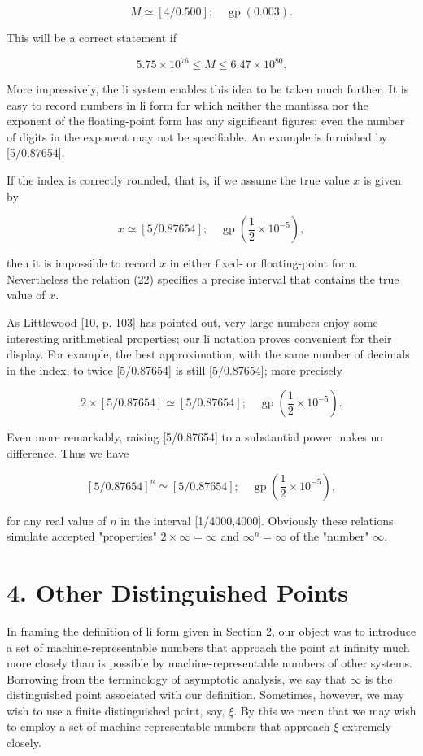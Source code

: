\documentclass[10pt]{article}
\begin{document}
$$
M \simeq[4 / 0.500] ; \quad \operatorname{gp}(0.003) .
$$

This will be a correct statement if

$$
5.75 \times 10^{76} \leq M \leq 6.47 \times 10^{80} .
$$

More impressively, the li system enables this idea to be taken much further. It is easy to record numbers in li form for which neither the mantissa nor the exponent of the floating-point form has any significant figures: even the number of digits in the exponent may not be specifiable. An example is furnished by\\[0pt]
[5/0.87654].

If the index is correctly rounded, that is, if we assume the true value $x$ is given by


\begin{equation*}
x \simeq[5 / 0.87654] ; \quad \operatorname{gp}\left(\frac{1}{2} \times 10^{-5}\right), \tag{22}
\end{equation*}


then it is impossible to record $x$ in either fixed- or floating-point form. Nevertheless the relation (22) specifies a precise interval that contains the true value of $x$.

As Littlewood [10, p. 103] has pointed out, very large numbers enjoy some interesting arithmetical properties; our li notation proves convenient for their\\[0pt]
display. For example, the best approximation, with the same number of decimals in the index, to twice [5/0.87654] is still [5/0.87654]; more precisely

$$
2 \times[5 / 0.87654] \simeq[5 / 0.87654] ; \quad \operatorname{gp}\left(\frac{1}{2} \times 10^{-5}\right) .
$$

Even more remarkably, raising [5/0.87654] to a substantial power makes no difference. Thus we have

$$
[5 / 0.87654]^{n} \simeq[5 / 0.87654] ; \quad \operatorname{gp}\left(\frac{1}{2} \times 10^{-5}\right),
$$

for any real value of $n$ in the interval [1/4000,4000]. Obviously these relations simulate accepted "properties" $2 \times \infty=\infty$ and $\infty^{n}=\infty$ of the "number" $\infty$.

\section*{4. Other Distinguished Points}
In framing the definition of li form given in Section 2, our object was to introduce a set of machine-representable numbers that approach the point at infinity much more closely than is possible by machine-representable numbers of other systems. Borrowing from the terminology of asymptotic analysis, we say that $\infty$ is the distinguished point associated with our definition. Sometimes, however, we may wish to use a finite distinguished point, say, $\xi$. By this we mean that we may wish to employ a set of machine-representable numbers that approach $\xi$ extremely closely.
\end{document}
